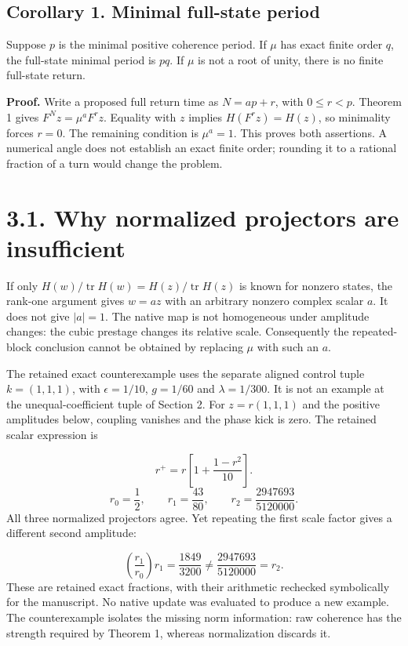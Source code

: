 \documentclass[11pt,a4paper]{article}
\begin{document}
\subsection*{Corollary 1. Minimal full-state period}
Suppose $p$ is the minimal positive coherence period. If $\mu$ has exact finite order $q$, the full-state minimal period is $pq$. If $\mu$ is not a root of unity, there is no finite full-state return.

\textbf{Proof.} Write a proposed full return time as $N=ap+r$, with $0\leq r<p$. Theorem 1 gives $F^N z=\mu^aF^r z$. Equality with $z$ implies $H(F^r z)=H(z)$, so minimality forces $r=0$. The remaining condition is $\mu^a=1$. This proves both assertions. A numerical angle does not establish an exact finite order; rounding it to a rational fraction of a turn would change the problem.

\clearpage
\section*{3.1. Why normalized projectors are insufficient}
If only $H(w)/\operatorname{tr}H(w)=H(z)/\operatorname{tr}H(z)$ is known for nonzero states, the rank-one argument gives $w=az$ with an arbitrary nonzero complex scalar $a$. It does not give $|a|=1$. The native map is not homogeneous under amplitude changes: the cubic prestage changes its relative scale. Consequently the repeated-block conclusion cannot be obtained by replacing $\mu$ with such an $a$. \cite{D02}

The retained exact counterexample uses the separate aligned control tuple $k=(1,1,1)$, with $\epsilon=1/10$, $g=1/60$ and $\lambda=1/300$. It is not an example at the unequal-coefficient tuple of Section 2. For $z=r(1,1,1)$ and the positive amplitudes below, coupling vanishes and the phase kick is zero. The retained scalar expression is

\begin{equation}r^+=r\left[1+\frac{1-r^2}{10}\right].\end{equation}
\begin{equation}r_0=\frac{1}{2},\qquad r_1=\frac{43}{80},\qquad r_2=\frac{2947693}{5120000}.\end{equation}
All three normalized projectors agree. Yet repeating the first scale factor gives a different second amplitude:

\begin{equation}\left(\frac{r_1}{r_0}\right)r_1=\frac{1849}{3200}\neq\frac{2947693}{5120000}=r_2.\end{equation}
These are retained exact fractions, with their arithmetic rechecked symbolically for the manuscript. No native update was evaluated to produce a new example. The counterexample isolates the missing norm information: raw coherence has the strength required by Theorem 1, whereas normalization discards it.
\end{document}
